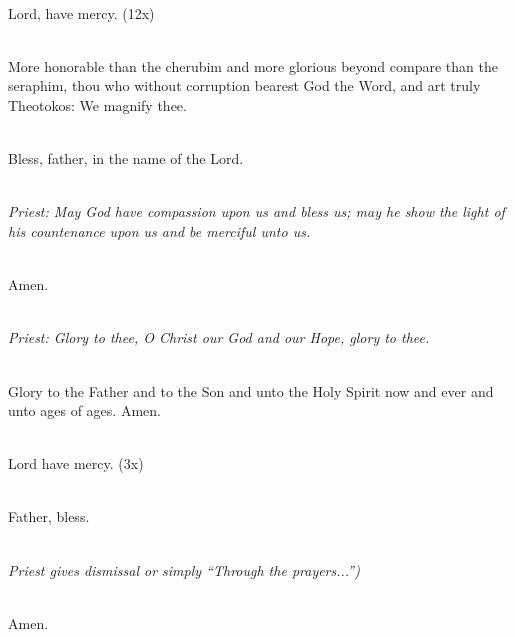 \mbox{}\\
Lord, have mercy. (12x)

\mbox{}\\
More honorable than the cherubim
and more glorious beyond compare than the seraphim,
thou who without corruption bearest God the Word,
and art truly Theotokos: We magnify thee.

\mbox{}\\
Bless, father, in the name of the Lord.

\mbox{}\\
\emph{Priest: May God have compassion upon us and bless us;
may he show the light of his countenance upon us and be merciful unto us.}

\mbox{}\\
Amen.

\mbox{}\\
\emph{Priest: Glory to thee,
O Christ our God and our Hope, glory to thee.}

\mbox{}\\
Glory to the Father and to the Son and unto the Holy Spirit
now and ever and unto ages of ages. Amen.

\mbox{}\\
Lord have mercy. (3x)

\mbox{}\\
Father, bless.

\mbox{}\\
\emph{Priest gives dismissal or simply ``Through the prayers...'')}

\mbox{}\\
Amen.
